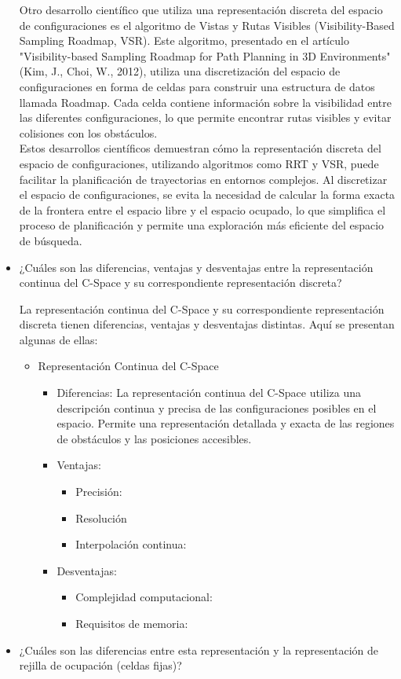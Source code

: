 \documentclass{article}
\begin{document}
\begin{itemize}
  Otro desarrollo científico que utiliza una representación discreta del espacio de configuraciones es el algoritmo de Vistas y Rutas Visibles (Visibility-Based Sampling Roadmap, VSR). Este algoritmo, presentado en el artículo "Visibility-based Sampling Roadmap for Path Planning in 3D Environments" (Kim, J., Choi, W., 2012), utiliza una discretización del espacio de configuraciones en forma de celdas para construir una estructura de datos llamada Roadmap. Cada celda contiene información sobre la visibilidad entre las diferentes configuraciones, lo que permite encontrar rutas visibles y evitar colisiones con los obstáculos.\\

  Estos desarrollos científicos demuestran cómo la representación discreta del espacio de configuraciones, utilizando algoritmos como RRT y VSR, puede facilitar la planificación de trayectorias en entornos complejos. Al discretizar el espacio de configuraciones, se evita la necesidad de calcular la forma exacta de la frontera entre el espacio libre y el espacio ocupado, lo que simplifica el proceso de planificación y permite una exploración más eficiente del espacio de búsqueda.
  
\item {¿Cuáles son las diferencias, ventajas y desventajas entre la representación continua del C-Space y su correspondiente representación discreta?}

  La representación continua del C-Space y su correspondiente representación discreta tienen diferencias, ventajas y desventajas distintas. Aquí se presentan algunas de ellas:
  \begin{itemize}
  \item Representación Continua del C-Space
    \begin{itemize}
    \item Diferencias: La representación continua del C-Space utiliza una descripción continua y precisa de las configuraciones posibles en el espacio. Permite una representación detallada y exacta de las regiones de obstáculos y las posiciones accesibles.
    \item Ventajas:
      \begin{itemize}
      \item Precisión:
      \item Resolución
        \item Interpolación continua:
      \end{itemize}
    \item Desventajas:
      
      \begin{itemize}
      \item Complejidad computacional:
      \item Requisitos de memoria:
      \end{itemize}
    \end{itemize}
  \end{itemize}
  
\item {¿Cuáles son las diferencias entre esta representación y la representación de rejilla de ocupación (celdas fijas)?}

  
  
\end{itemize}
\end{document}
